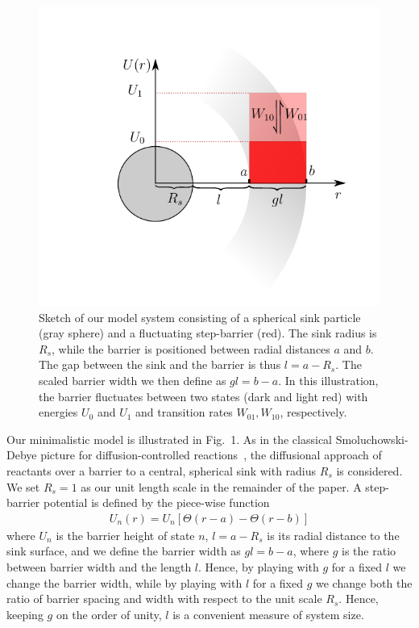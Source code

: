 \documentclass[preprint,superscriptaddress]{revtex4-1}
\begin{document}
\begin{figure}[H]
\begin{center}
	\includegraphics[width = 0.5 \textwidth]{plots/Skizze.pdf}
    \caption{Sketch of our model system consisting of a spherical sink particle (gray sphere) and a fluctuating step-barrier (red). The sink radius is $R_s$, while the barrier is positioned between radial distances $a$ and $b$. The gap between the sink and the  barrier is thus $l=a-R_s$.  The scaled barrier width we then define as $gl=b-a$. In this illustration, the barrier fluctuates between two states (dark and light red) with energies $U_0$ and $U_1$ and transition rates $W_{01}, W_{10}$, respectively.}
\label{fig0}
\end{center}
\end{figure}

Our minimalistic model is illustrated in Fig.~1. As in the classical Smoluchowski-Debye picture for diffusion-controlled reactions~\cite{Smoluchowski1917a, Debye1942},  the diffusional approach of reactants over a barrier to a central, spherical sink with radius $R_s$ is considered.  We set $R_s=1$  as our unit length scale in the remainder of the paper. A step-barrier potential is defined by the piece-wise function 
 \begin{eqnarray}
 U_n(r) = U_n \left[\Theta(r-a)-\Theta(r-b)\right] 
 \end{eqnarray}
where $U_n$ is the barrier height of state $n$, $l=a-R_s$ is its radial distance to the sink surface, and we define the barrier width as $gl=b-a$, 
where $g$ is the ratio between barrier width and the length $l$. Hence, by playing with $g$ for a fixed $l$ we change the barrier width, 
while by playing with $l$ for a fixed $g$ we change both the ratio of barrier spacing and width with respect to the unit scale $R_s$. Hence, keeping $g$ on the
order of unity, $l$ is a convenient measure of system size. 
\end{document}
